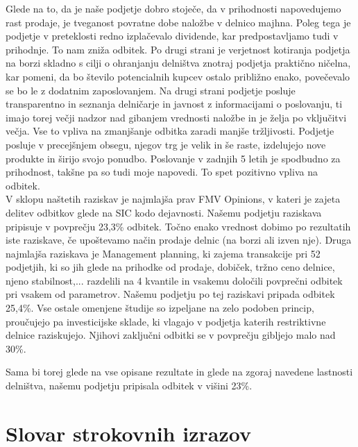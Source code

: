 \documentclass[12pt,a4paper]{amsart}
\theoremstyle{definition} %
\theoremstyle{plain} %
\newcommand{\geslo}[2]{\noindent\textbf{#1}\hspace*{3mm}\hangindent=\parindent\hangafter=1 #2}
\begin{document}
\begin{itemize}
Glede na to, da je naše podjetje dobro stoječe, da v prihodnosti napovedujemo rast prodaje, je tveganost povratne dobe naložbe v delnico majhna. Poleg tega je podjetje v preteklosti redno izplačevalo dividende, kar predpostavljamo tudi v prihodnje. To nam zniža odbitek. Po drugi strani je verjetnost kotiranja podjetja na borzi skladno s cilji o ohranjanju delništva znotraj podjetja praktično ničelna, kar pomeni, da bo število potencialnih kupcev ostalo približno enako, povečevalo se bo le z dodatnim zaposlovanjem. Na drugi strani podjetje posluje transparentno in seznanja delničarje in javnost z informacijami o poslovanju, ti imajo torej večji nadzor nad gibanjem vrednosti naložbe in je želja po vključitvi večja. Vse to vpliva na zmanjšanje odbitka zaradi manjše tržljivosti. Podjetje posluje v precejšnjem obsegu, njegov trg je velik in še raste, izdelujejo nove produkte in širijo svojo ponudbo. Poslovanje v zadnjih 5 letih je spodbudno za prihodnost, takšne pa so tudi moje napovedi. To spet pozitivno vpliva na odbitek. \\
V sklopu naštetih raziskav je najmlajša prav FMV Opinions, v kateri je zajeta delitev odbitkov glede na SIC kodo dejavnosti. Našemu podjetju raziskava pripisuje v povprečju 23,3\% odbitek. Točno enako vrednost dobimo po rezultatih iste raziskave, če upoštevamo način prodaje delnic (na borzi ali izven nje). Druga najmlajša raziskava je Management planning, ki zajema transakcije pri 52 podjetjih, ki so jih glede na prihodke od prodaje, dobiček, tržno ceno delnice, njeno stabilnost,... razdelili na 4 kvantile in vsakemu določili povprečni odbitek pri vsakem od parametrov. Našemu podjetju po tej raziskavi pripada odbitek 25,4\%. Vse ostale omenjene študije so izpeljane na zelo podoben princip, proučujejo pa investicijske sklade, ki vlagajo v podjetja katerih restriktivne delnice raziskujejo. Njihovi zaključni odbitki se v povprečju gibljejo malo nad 30\%.\par
Sama bi torej glede na vse opisane rezultate in glede na zgoraj navedene lastnosti delništva, našemu podjetju pripisala odbitek v višini 23\%.



\end{itemize}



\section*{Slovar strokovnih izrazov}

%
%


\begin{thebibliography}{99}




\end{thebibliography}
\end{document}
